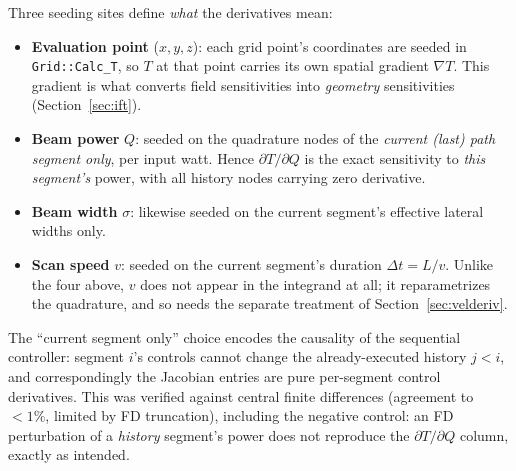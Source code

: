 \documentclass[11pt]{article}
\begin{document}
Three seeding sites define \emph{what} the derivatives mean:
\begin{itemize}
  \item \textbf{Evaluation point} ($x,y,z$): each grid point's coordinates are
        seeded in \texttt{Grid::Calc\_T}, so $T$ at that point carries its own
        spatial gradient $\nabla T$. This gradient is what converts field
        sensitivities into \emph{geometry} sensitivities
        (Section~\ref{sec:ift}).
  \item \textbf{Beam power} $Q$: seeded on the quadrature nodes of the
        \emph{current (last) path segment only}, per input watt. Hence
        $\partial T/\partial Q$ is the exact sensitivity to \emph{this
        segment's} power, with all history nodes carrying zero derivative.
  \item \textbf{Beam width} $\sigma$: likewise seeded on the current
        segment's effective lateral widths only.
  \item \textbf{Scan speed} $v$: seeded on the current segment's duration
        $\Delta t = L/v$. Unlike the four above, $v$ does not appear in the
        integrand at all; it reparametrizes the quadrature, and so needs the
        separate treatment of Section~\ref{sec:velderiv}.
\end{itemize}
The ``current segment only'' choice encodes the causality of the sequential
controller: segment $i$'s controls cannot change the already-executed history
$j<i$, and correspondingly the Jacobian entries are pure per-segment control
derivatives. This was verified against central finite differences (agreement
to $<1\%$, limited by FD truncation), including the negative control: an FD
perturbation of a \emph{history} segment's power does not reproduce the
$\partial T/\partial Q$ column, exactly as intended.
\end{document}
